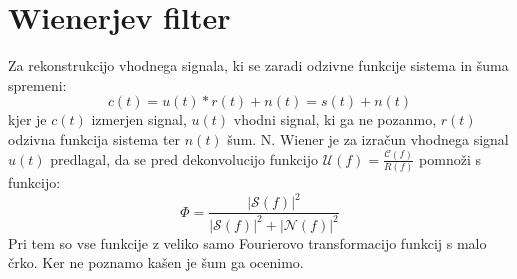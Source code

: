 \documentclass[slovene,11pt,a4paper]{article}
\numberwithin{equation}{section} %
\numberwithin{figure}{section} %
\numberwithin{table}{section} %
\begin{document}
\section{Wienerjev filter}

Za rekonstrukcijo vhodnega signala, ki se zaradi odzivne funkcije sistema in šuma spremeni:
\begin{equation*}
c(t)=u(t)*r(t)+n(t)=s(t)+n(t)
\end{equation*}
kjer je $c(t)$ izmerjen signal, $u(t)$ vhodni signal, ki ga ne pozanmo, $r(t)$ odzivna funkcija sistema ter $n(t)$ šum. N. Wiener je za izračun vhodnega signal $u(t)$ predlagal, da se pred dekonvolucijo funkcijo $\mathcal{U}(f)=\frac{\mathcal{C}(f)}{R(f)}$ pomnoži s funkcijo:
\begin{equation}
\Phi=\frac{|\mathcal{S}(f)|^2}{|\mathcal{S}(f)|^2+|\mathcal{N}(f)|^2}
\end{equation}
Pri tem so vse funkcije z veliko samo Fourierovo transformacijo funkcij s malo črko. Ker ne poznamo kašen je šum ga ocenimo.
\end{document}
